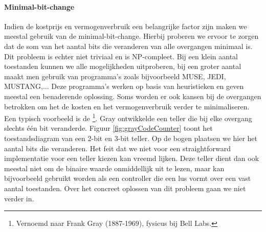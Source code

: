 \paragraph{Minimal-bit-change}Indien de kostprijs en vermogenverbruik een belangrijke factor zijn maken we meestal gebruik van de minimal-bit-change. Hierbij proberen we ervoor te zorgen dat de som van het aantal bits die veranderen van alle overgangen minimaal is. Dit probleem is echter niet triviaal en is NP-compleet. Bij een klein aantal toestanden kunnen we alle mogelijkheden uitproberen, bij een groter aantal maakt men gebruik van programma's zoals bijvoorbeeld MUSE, JEDI, MUSTANG,... Deze programma's werken op basis van heuristieken en geven meestal een benaderende oplossing. Soms worden er ook kansen bij de overgangen betrokken om het de kosten en het vermogenverbruik verder te minimaliseren. Een typisch voorbeeld is de \footnote{Vernoemd naar Frank Gray (1887-1969), fysicus bij Bell Labs.}. Gray ontwikkelde een teller die bij elke overgang slechts \'e\'en bit veranderde. Figuur \ref{fig:grayCodeCounter} toont het toestandsdiagram van een 2-bit en 3-bit teller. Op de bogen plaatsen we hier het aantal bits die veranderen. Het feit dat we niet voor een straightforward implementatie voor een teller kiezen kan vreemd lijken. Deze teller dient dan ook meestal niet om de binaire waarde onmiddellijk uit te lezen, maar kan bijvoorbeeld gebruikt worden als een controller die een lus vormt over een vast aantal toestanden. Over het concreet oplossen van dit probleem gaan we niet verder in.
